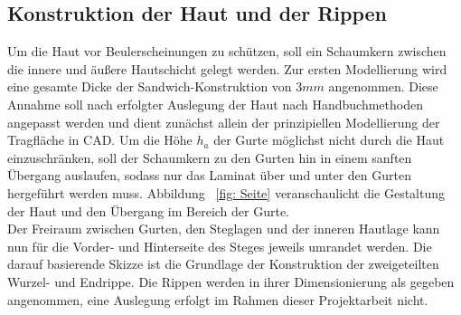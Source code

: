 \subsection{Konstruktion der Haut und der Rippen}
Um die Haut vor Beulerscheinungen zu schützen, soll ein Schaumkern zwischen die innere und äußere Hautschicht gelegt werden. Zur ersten Modellierung wird eine gesamte Dicke der Sandwich-Konstruktion von $ 3mm $ angenommen. Diese Annahme soll nach erfolgter Auslegung der Haut nach Handbuchmethoden angepasst werden und dient zunächst allein der prinzipiellen Modellierung der Tragfläche in CAD. Um die Höhe $ h_{a} $ der Gurte möglichst nicht durch die Haut einzuschränken, soll der Schaumkern zu den Gurten hin in einem sanften Übergang auslaufen, sodass nur das Laminat über und unter den Gurten hergeführt werden muss. Abbildung ~\ref{fig: Seite} veranschaulicht die Gestaltung der Haut und den Übergang im Bereich der Gurte.\\

\noindent Der Freiraum zwischen Gurten, den Steglagen und der inneren Hautlage kann nun für die Vorder- und Hinterseite des Steges jeweils umrandet werden. Die darauf basierende Skizze ist die Grundlage der Konstruktion der zweigeteilten Wurzel- und Endrippe. Die Rippen werden in ihrer Dimensionierung als gegeben angenommen, eine Auslegung erfolgt im Rahmen dieser Projektarbeit nicht.\\

